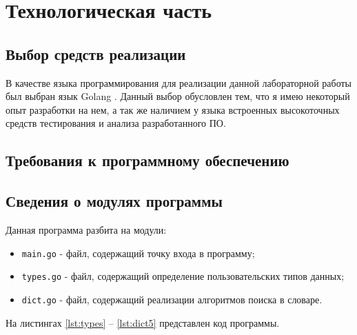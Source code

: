 \chapter{Технологическая часть}

\section{Выбор средств реализации}

В качестве языка программирования для реализации данной лабораторной работы был выбран язык Golang \cite{golang}. Данный выбор обусловлен тем, что я имею некоторый опыт разработки на нем, а так же наличием у языка встроенных высокоточных средств тестирования и анализа разработанного ПО.

\section{Требования к программному обеспечению}

\section{Сведения о модулях программы}

Данная программа разбита на модули:
\begin{itemize}
    \item \texttt{main.go} - файл, содержащий точку входа в программу;
    \item \texttt{types.go} - файл, содержащий определение пользовательских типов данных;
	\item \texttt{dict.go} - файл, содержащий реализации алгоритмов поиска в словаре.
\end{itemize}

На листингах \ref{lst:types} -- \ref{lst:dict5} представлен код программы.



\clearpage



